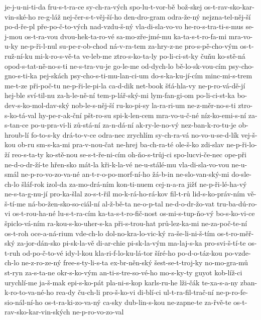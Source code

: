 {je-j-u-ni-ti-da
fru-s-t-ra-ce
sy-ch-ra-vých
spo-lu-t-vor-bě
bož-skej
os-t-rav-sko-kar-vin-ské-ho
re-g-láž
nej-čer-s-t-věj-ší-ho
den-dro-gram
odra-že-ný
nejzna-tel-něj-ší
po-d-ře-pl
pře-po-č-to-vých
nad-vzdu-š-ný
vla-di-sla-vo-vo
he-ro-s-tra-ti-s-mus
se-j-mou
os-t-ra-vou
dvou-hek-ta-ro-vé
sa-mo-zře-jmé-mu
ka-ta-s-t-ro-fa-mi
mra-vo-u-ky
ne-p-ři-l-nul
su-pe-r-ob-chod
ná-v-ra-tem
za-hry-z-ne
pro-s-pě-cho-vým
os-t-ruž-ní-ku
mi-k-ro-s-vě-ta
ve-leb-me
ztro-s-ko-ta-ly
po-li-ci-st-ky
čuňu
ko-stě-ná
opod-s-tat-ně-no-s-ti
ne-s-tra-vu-je
go-le-me
od-dych-lo
bě-lo-sk-vou-cím
psy-cho-gno-s-ti-ka
pej-skách
psy-cho-s-ti-mu-lan-ci-um
do-s-ka-ku-jí-cím
minc-mi-s-trem
me-t-ze
při-poč-tu
ne-p-ři-le-pi-la
ca-d-dik
net-book
šťá-hla-vy
ne-p-ro-vá-dě-jí
hej-ble
sví-til-nu
za-h-le-ně-ní
tem-p-lář-ský-mi
lym-fan-gi-om
po-li-ci-st-ka
bo-dev-s-ko-mol-dav-ský
nob-le-s-něj-ší
ru-ko-pi-sy
la-ra-ri-um
ne-z-měr-no-s-ti
ztro-s-ko-tá-val
hy-pe-r-ak-ční
pšt-ro-su
spi-k-len-cem
mra-vo-u-č-né
níz-ko-emi-s-ní
za-s-tan-ce
po-u-pra-vi-li
zů-stá-ní
za-n-dá-ní
ak-ry-le-no-vý
nez-ban-k-ro-tu-je
ob-hroub-lí
fo-to-s-ky
drá-to-v-ce
odra-nec
zrychlím
sy-ch-ra-vá
no-vo-u-se-d-lík
vej-š-kou
ob-ru
sm-s-ka-mi
pra-v-nou-čat
ne-hrej
ba-ch-ra-té
ole-š-ko
zdi-slav
ne-p-ři-lo-ží
reo-s-ta-ty
ko-stě-nou
se-s-t-ře-ni-cím
oh-ňo-s-trůj-ci
spo-lucvi-če-nec
ope-při
ne-d-o-dr-ží-te
hřen-sko
mát-la
kři-k-la-vé
ne-u-stálé-mu
vla-di-sla-vo-vou
ne-u-smál
ne-p-ro-vo-zo-va-né
an-t-r-o-po-morf-ní-ho
žá-b-in
ne-slo-van-ský-mi
do-sle-ch-lo
šláf-rok
izol-da
za-mo-drá-ním
kon-ti-nuem
cej-n-a-ra
jižť
ne-p-ři-lé-ha-vý
ne-s-ta-g-nu-jí
pro-ka-šlal
zo-s-t-řil
mo-k-rá-ho-rá-kov
fil-t-rů
lid-s-ko-práv-ním
vě-š-tí-me
ná-bo-žen-sko-so-ciál-ní
al-ž-bě-ta
ne-o-p-tal
ne-d-o-dr-žo-vat
tru-ba-dú-ro-vi
os-t-rou-ha-né
lu-s-t-ra-cím
ka-ta-s-t-ro-fič-nost
os-mi-s-tup-ňo-vý
bo-s-ko-vi-ce
špiclo-vá-ním
ra-kou-s-ko-uher-s-ka
při-s-trou-hat
prů-lez-ka-mi
ne-za-poč-te-ní
os-t-roh
oce-a-ná-rium
vde-ch-lo
dol-no-kra-lo-vic-ký
ra-še-li-ni-š-tím
os-t-ro-měř-ský
za-jor-dán-sko
pi-sk-la-vě
di-ar-chie
pi-sk-la-vým
ma-laj-s-ka
pro-svi-š-tí-te
os-t-ruh
od-po-č-to-vé
idy-l-kou
kla-ri-f-lo-ku-lá-tor
šíré-ho
po-d-o-táz-kou
po-vzde-ch-lo
ne-z-ro-ze-ný
free-s-ty-li-s-ta
ex-br-něn-ský
šest-se-t-troj-ky
no-mo-gra-mů
st-ryn
za-s-ta-ne
okr-s-ko-vým
an-ti-s-tre-so-vé-ho
mo-s-ky-ty
guyot
kob-líž-ci
urychlí-me
ja-š-mak
epi-s-ko-pát
pla-ni-s-kop
karls-ru-he
lži-čák
te-xa-s-a-ny
zban-k-ro-to-va-né-ho
rea-dy
ču-ch-li
pro-š-ko-vi
di-blí-ci
ul-t-ra-fil-trač-ní
ne-p-ro-fe-sio-nál-ní-ho
os-t-ra-ki-zo-va-ný
ca-sky
dub-lin-s-kou
ne-zapne-te
za-řvě-te
os-t-rav-sko-kar-vin-ských
ne-p-ro-vo-zo-val
}
